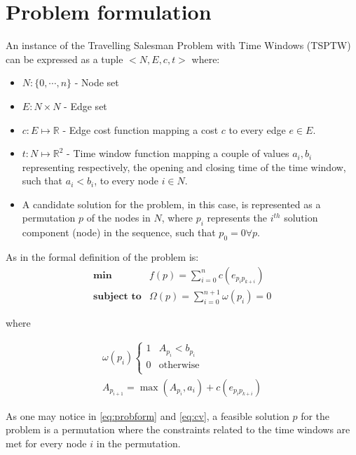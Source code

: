 \documentclass{article}
\begin{document}
\section{Problem formulation}\label{sec:probform}
An instance of the Travelling Salesman Problem with Time Windows (TSPTW) can be expressed as a tuple $<N,E,c,t>$ where:
\begin{itemize}
  \item $N:\{0,\cdots,n\}$ - Node set 
  \item $E:N\times N$ - Edge set
  \item $c:E\mapsto \mathbb{R}$ - Edge cost function mapping a cost $c$ to every edge $e \in E$. 
  \item $t:N\mapsto \mathbb{R}^2$ - Time window function mapping a couple of values $a_i,b_i$ representing respectively, the opening and closing time of the time window, such that $a_i<b_i$, to every node $i \in N$.
  \item A candidate solution for the problem, in this case, is represented as a permutation $p$ of the nodes in $N$, where $p_i$ represents the $i^{th}$ solution component (node) in the sequence, such that $p_0 = 0 \forall p$.
\end{itemize}

As in \cite{lopez2010beam} the formal definition of the problem is:
\begin{equation} \label{eq:probform}
 \begin{array}{rl}
  \textbf{min} & f(p)= \sum\limits_{i=0}^{n} c(e_{p_{i}p_{k+i}}) \\
  \textbf{subject to} & \Omega(p)= \sum\limits_{i=0}^{n+1} \omega(p_{i}) = 0
 \end{array}
\end{equation}

where

\begin{equation} \label{eq:cv}
\begin{array}{c}
 \omega(p_{i}) \begin{cases}
                1 & A_{p_i} < b_{p_i}  \\
                0 & \text{otherwise} \\   
               \end{cases} \\
 A_{p_{i+1}} = \max(A_{p_i},a_i) + c(e_{p_{i}p_{k+i}}) 
\end{array}
\end{equation}

As one may notice in \ref{eq:probform} and \ref{eq:cv}, a feasible solution $p$ for the problem is a permutation where the constraints related to the time windows are met for every node $i$ in the permutation.
\end{document}

